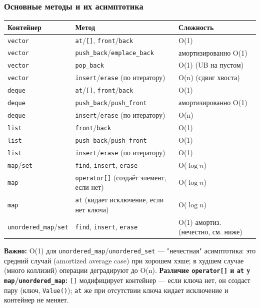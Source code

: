 \subsubsection{Основные методы и их асимптотика}
\begin{center}
\begin{tabular}{|l|l|l|}
\hline
\textbf{Контейнер} & \textbf{Метод} & \textbf{Сложность} \\
\hline
\texttt{vector} & \texttt{at}/\texttt{[]}, \texttt{front}/\texttt{back} & O(1) \\
\texttt{vector} & \texttt{push\_back}/\texttt{emplace\_back} & амортизированно O(1) \\
\texttt{vector} & \texttt{pop\_back} & O(1) (UB на пустом) \\
\texttt{vector} & \texttt{insert}/\texttt{erase} (по итератору) & O(n) (сдвиг хвоста) \\
\hline
\texttt{deque} & \texttt{at}/\texttt{[]}, \texttt{front}/\texttt{back} & O(1) \\
\texttt{deque} & \texttt{push\_back}/\texttt{push\_front} & амортизированно O(1) \\
\texttt{deque} & \texttt{insert}/\texttt{erase} (по итератору) & O(n) \\
\hline
\texttt{list} & \texttt{front}/\texttt{back} & O(1) \\
\texttt{list} & \texttt{push\_back}/\texttt{push\_front} & O(1) \\
\texttt{list} & \texttt{insert}/\texttt{erase} (по итератору) & O(1) \\
\hline
\texttt{map}/\texttt{set} & \texttt{find}, \texttt{insert}, \texttt{erase} & O($\log n$) \\
\texttt{map} & \texttt{operator[]} (создаёт элемент, если нет) & O($\log n$) \\
\texttt{map} & \texttt{at} (кидает исключение, если нет ключа) & O($\log n$) \\
\hline
\texttt{unordered\_map}/\texttt{set} & \texttt{find}, \texttt{insert}, \texttt{erase} & O(1) амортиз. (нечестно, см. ниже) \\
\hline
\end{tabular}
\end{center}
\textbf{Важно:} O(1) для \texttt{unordered\_map}/\texttt{unordered\_set} --- "нечестная" асимптотика: это средний случай (amortized average case) при хорошем хэше; в худшем случае (много коллизий) операции деградируют до O(n).
\textbf{Различие \texttt{operator[]} и \texttt{at} у \texttt{map}/\texttt{unordered\_map}:} \texttt{[]} модифицирует контейнер --- если ключа нет, он создаст пару (ключ, \texttt{Value()}); \texttt{at} же при отсутствии ключа кидает исключение и контейнер не меняет.
